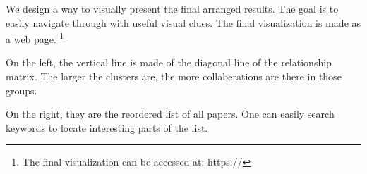 We design a way to visually present the final arranged results.
The goal is to easily navigate through with useful visual clues.
The final visualization is made as a web page.
\footnote{The final visualization can be accessed at: https://}

On the left, the vertical line is made of the diagonal line of the relationship matrix.
The larger the clusters are, the more collaberations are there in those groups.

On the right, they are the reordered list of all papers.
One can easily search keywords to locate interesting parts of the list.
